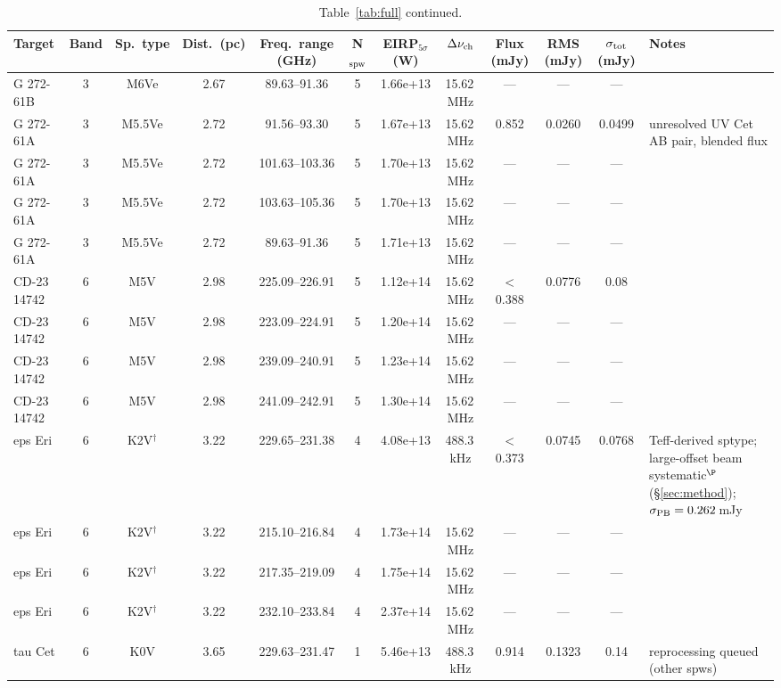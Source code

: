 \documentclass{openjournal}
\begin{document}
\begin{table}
\centering
\scriptsize
\setlength{\tabcolsep}{2pt}
\caption{Table~\ref{tab:full} continued.}
\label{tab:full2}
\begin{tabularx}{\textwidth}{@{}l c c c c c c c c c c X@{}}
\hline
Target & Band & Sp.\ type & Dist.\ (pc) & Freq.\ range (GHz) & N$_{\rm spw}$ & EIRP$_{5\sigma}$ (W) & $\Delta\nu_{\rm ch}$ & Flux (mJy) & RMS (mJy) & $\sigma_{\rm tot}$ (mJy) & Notes \\
\hline
 G 272-61B & 3 & M6Ve & 2.67 & 89.63--91.36 & 5 & 1.66e+13 & 15.62\,MHz & --- & --- & --- &  \\
 G 272-61A & 3 & M5.5Ve & 2.72 & 91.56--93.30 & 5 & 1.67e+13 & 15.62\,MHz & 0.852 & 0.0260 & 0.0499 & unresolved UV Cet AB pair, blended flux \\
 G 272-61A & 3 & M5.5Ve & 2.72 & 101.63--103.36 & 5 & 1.70e+13 & 15.62\,MHz & --- & --- & --- &  \\
 G 272-61A & 3 & M5.5Ve & 2.72 & 103.63--105.36 & 5 & 1.70e+13 & 15.62\,MHz & --- & --- & --- &  \\
 G 272-61A & 3 & M5.5Ve & 2.72 & 89.63--91.36 & 5 & 1.71e+13 & 15.62\,MHz & --- & --- & --- &  \\
 CD-23 14742 & 6 & M5V & 2.98 & 225.09--226.91 & 5 & 1.12e+14 & 15.62\,MHz & $<$0.388 & 0.0776 & 0.08 &  \\
 CD-23 14742 & 6 & M5V & 2.98 & 223.09--224.91 & 5 & 1.20e+14 & 15.62\,MHz & --- & --- & --- &  \\
 CD-23 14742 & 6 & M5V & 2.98 & 239.09--240.91 & 5 & 1.23e+14 & 15.62\,MHz & --- & --- & --- &  \\
 CD-23 14742 & 6 & M5V & 2.98 & 241.09--242.91 & 5 & 1.30e+14 & 15.62\,MHz & --- & --- & --- &  \\
 eps Eri & 6 & K2V$^\dagger$ & 3.22 & 229.65--231.38 & 4 & 4.08e+13 & 488.3\,kHz & $<$0.373 & 0.0745 & 0.0768 & Teff-derived sptype; large-offset beam systematic$^{\P}$ (\S\ref{sec:method}); $\sigma_{\rm PB}=0.262$\,mJy \\
 eps Eri & 6 & K2V$^\dagger$ & 3.22 & 215.10--216.84 & 4 & 1.73e+14 & 15.62\,MHz & --- & --- & --- &  \\
 eps Eri & 6 & K2V$^\dagger$ & 3.22 & 217.35--219.09 & 4 & 1.75e+14 & 15.62\,MHz & --- & --- & --- &  \\
 eps Eri & 6 & K2V$^\dagger$ & 3.22 & 232.10--233.84 & 4 & 2.37e+14 & 15.62\,MHz & --- & --- & --- &  \\
 tau Cet & 6 & K0V & 3.65 & 229.63--231.47 & 1 & 5.46e+13 & 488.3\,kHz & 0.914 & 0.1323 & 0.14 & reprocessing queued (other spws) \\

\end{tabularx}
\end{table}
\end{document}
